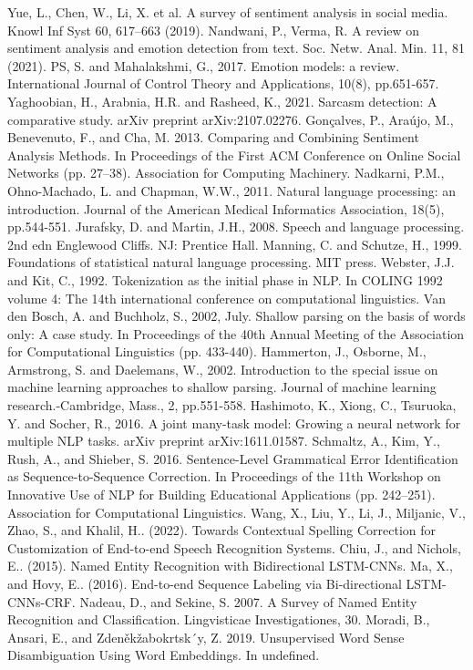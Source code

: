\documentclass[conference]{IEEEtran}
\begin{document}
\begin{thebibliography}{00}
 Yue, L., Chen, W., Li, X. et al. A survey of sentiment analysis in social media. Knowl Inf Syst 60, 617–663 (2019).
 Nandwani, P., Verma, R. A review on sentiment analysis and emotion detection from text. Soc. Netw. Anal. Min. 11, 81 (2021).
 PS, S. and Mahalakshmi, G., 2017. Emotion models: a review. International Journal of Control Theory and Applications, 10(8), pp.651-657.
 Yaghoobian, H., Arabnia, H.R. and Rasheed, K., 2021. Sarcasm detection: A comparative study. arXiv preprint arXiv:2107.02276.
 Gonçalves, P., Araújo, M., Benevenuto, F., and Cha, M. 2013. Comparing and Combining Sentiment Analysis Methods. In Proceedings of the First ACM Conference on Online Social Networks (pp. 27–38). Association for Computing Machinery.
 Nadkarni, P.M., Ohno-Machado, L. and Chapman, W.W., 2011. Natural language processing: an introduction. Journal of the American Medical Informatics Association, 18(5), pp.544-551.
 Jurafsky, D. and Martin, J.H., 2008. Speech and language processing. 2nd edn Englewood Cliffs. NJ: Prentice Hall.
 Manning, C. and Schutze, H., 1999. Foundations of statistical natural language processing. MIT press.
 Webster, J.J. and Kit, C., 1992. Tokenization as the initial phase in NLP. In COLING 1992 volume 4: The 14th international conference on computational linguistics.
 Van den Bosch, A. and Buchholz, S., 2002, July. Shallow parsing on the basis of words only: A case study. In Proceedings of the 40th Annual Meeting of the Association for Computational Linguistics (pp. 433-440).
 Hammerton, J., Osborne, M., Armstrong, S. and Daelemans, W., 2002. Introduction to the special issue on machine learning approaches to shallow parsing. Journal of machine learning research.-Cambridge, Mass., 2, pp.551-558.
 Hashimoto, K., Xiong, C., Tsuruoka, Y. and Socher, R., 2016. A joint many-task model: Growing a neural network for multiple NLP tasks. arXiv preprint arXiv:1611.01587.
 Schmaltz, A., Kim, Y., Rush, A., and Shieber, S. 2016. Sentence-Level Grammatical Error Identification as Sequence-to-Sequence Correction. In Proceedings of the 11th Workshop on Innovative Use of NLP for Building Educational Applications (pp. 242–251). Association for Computational Linguistics.
 Wang, X., Liu, Y., Li, J., Miljanic, V., Zhao, S., and Khalil, H.. (2022). Towards Contextual Spelling Correction for Customization of End-to-end Speech Recognition Systems.
 Chiu, J., and Nichols, E.. (2015). Named Entity Recognition with Bidirectional LSTM-CNNs.
 Ma, X., and Hovy, E.. (2016). End-to-end Sequence Labeling via Bi-directional LSTM-CNNs-CRF.
 Nadeau, D., and Sekine, S. 2007. A Survey of Named Entity Recognition and Classification. Lingvisticae Investigationes, 30.
 Moradi, B., Ansari, E., and Zdeněkžabokrtsk´y, Z. 2019. Unsupervised Word Sense Disambiguation Using Word Embeddings. In undefined.


\end{thebibliography}
\end{document}
